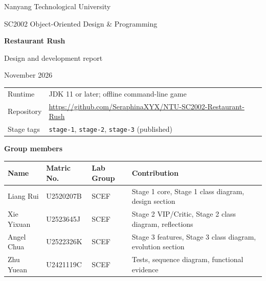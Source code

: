 \documentclass[11pt,a4paper]{article}
\begin{document}
\begin{titlepage}
\centering
\vspace*{1.5cm}
{\large Nanyang Technological University\par}
\vspace{0.8cm}
{\large SC2002 Object-Oriented Design \& Programming\par}
\vspace{1.3cm}
{\Huge\bfseries Restaurant Rush\par}
\vspace{0.4cm}
{\Large Design and development report\par}
\vspace{0.8cm}
{\large November 2026\par}
\vspace{1cm}
\begin{tabularx}{\textwidth}{@{}lX@{}}
\toprule
Runtime & JDK 11 or later; offline command-line game\\
Repository & \url{https://github.com/SeraphinaXYX/NTU-SC2002-Restaurant-Rush}\\
Stage tags & \texttt{stage-1}, \texttt{stage-2}, \texttt{stage-3} (published)\\
\bottomrule
\end{tabularx}
\vspace{1.2cm}
\textbf{Group members}
\vspace{0.3cm}

\begin{tabularx}{\textwidth}{@{}l l l X@{}}
\toprule
\textbf{Name} & \textbf{Matric No.} & \textbf{Lab Group} & \textbf{Contribution} \\
\midrule
Liang Rui & U2520207B & SCEF & Stage 1 core, Stage 1 class diagram, design section \\
Xie Yixuan & U2523645J & SCEF & Stage 2 VIP/Critic, Stage 2 class diagram, reflections \\
Angel Chua & U2522326K & SCEF & Stage 3 features, Stage 3 class diagram, evolution section \\
Zhu Yuean & U2421119C & SCEF & Tests, sequence diagram, functional evidence \\
\bottomrule
\end{tabularx}
\vfill
\end{titlepage}
\tableofcontents
\clearpage
\end{document}

